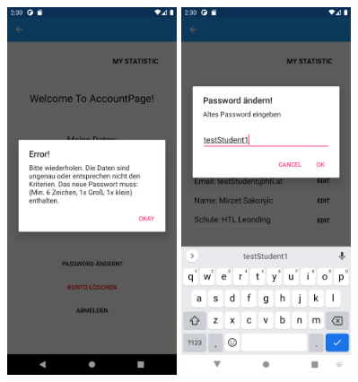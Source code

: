\begin{figure}[h]
    \begin{center}
    \includegraphics[width=5cm]{pics/Xamarin Student/19 Pass change.png}\hfill
    \includegraphics[width=5cm]{pics/Xamarin Student/20.png}
    \end{center}
\end{figure}
